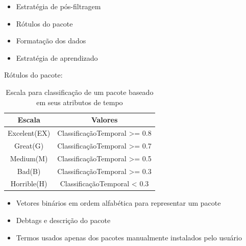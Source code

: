 \begin{frame}

    \begin{itemize}
        \item Estratégia de pós-filtragem
        \item Rótulos do pacote
        \item Formatação dos dados
        \item Estratégia de aprendizado
    \end{itemize}

\end{frame}

\begin{frame}

    Rótulos do pacote:
    \newline
    \newline

    \begin{table}[h]
    \centering
    \begin{tabular}{cc}
    \hline
    \rowcolor[HTML]{EFEFEF}
    {Escala} & {Valores} \\ \hline
    {Excelent(EX)}  & ClassificaçãoTemporal >= 0.8                  \\ \hline
    {Great(G)}   & ClassificaçãoTemporal >= 0.7                  \\ \hline
    {Medium(M)}   & ClassificaçãoTemporal >= 0.5                  \\ \hline
    {Bad(B)}   & ClassificaçãoTemporal >= 0.3                  \\ \hline
    {Horrible(H)}   &ClassificaçãoTemporal < 0.3                   \\ \hline
    \end{tabular}
    \caption{Escala para classificação de um pacote baseado em seus atributos de tempo}
    \label{tab:classificacao_pacotes}
    \end{table}

\end{frame}

\begin{frame}

    \begin{itemize}
        \item Vetores binários em ordem alfabética para representar um pacote
        \item Debtags e descrição do pacote
        \item Termos usados apenas dos pacotes manualmente instalados pelo
              usuário
    \end{itemize}
\end{frame}

